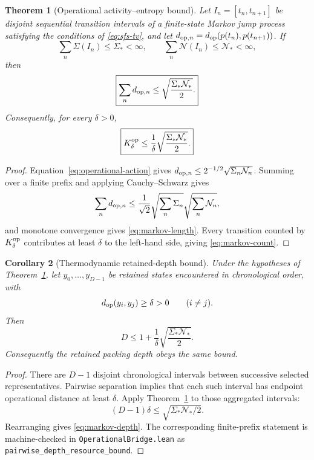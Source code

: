 \documentclass[11pt,a4paper]{article}
\newtheorem{theorem}{Theorem}[section]
\newtheorem{corollary}[theorem]{Corollary}
\theoremstyle{definition}
\numberwithin{equation}{section}
\begin{document}
\begin{theorem}[Operational activity--entropy bound]
\label{thm:markov-operational}
Let $I_n=[t_n,t_{n+1}]$ be disjoint sequential transition intervals of a
finite-state Markov jump process satisfying the conditions of
\eqref{eq:sfs-tv}, and let
$d_{{\rm op},n}=d_{\rm op}(p(t_n),p(t_{n+1}))$.
If
\[
\sum_n\Sigma(I_n)\le\Sigma_*<\infty,
\qquad
\sum_n\mathcal N(I_n)\le\mathcal N_*<\infty,
\]
then
\begin{equation}
\boxed{
\sum_n d_{{\rm op},n}
\le
\sqrt{\frac{\Sigma_*\mathcal N_*}{2}}.
}
\label{eq:markov-length}
\end{equation}
Consequently, for every $\delta>0$,
\begin{equation}
\boxed{
K_\delta^{\rm op}
\le
\frac1\delta
\sqrt{\frac{\Sigma_*\mathcal N_*}{2}}.
}
\label{eq:markov-count}
\end{equation}
\end{theorem}

\begin{proof}
Equation~\eqref{eq:operational-action} gives
$d_{{\rm op},n}\le
2^{-1/2}\sqrt{\Sigma_n\mathcal N_n}$.
Summing over a finite prefix and applying Cauchy--Schwarz gives
\[
\sum_n d_{{\rm op},n}
\le
\frac1{\sqrt2}
\sqrt{\sum_n\Sigma_n}
\sqrt{\sum_n\mathcal N_n},
\]
and monotone convergence gives \eqref{eq:markov-length}.
Every transition counted by $K_\delta^{\rm op}$ contributes at least
$\delta$ to the left-hand side, giving \eqref{eq:markov-count}.
\end{proof}

\begin{corollary}[Thermodynamic retained-depth bound]
\label{cor:markov-depth}
Under the hypotheses of Theorem~\ref{thm:markov-operational}, let
$y_0,\ldots,y_{D-1}$ be retained states encountered in chronological order,
with
\[
d_{\rm op}(y_i,y_j)\ge\delta>0
\qquad(i\ne j).
\]
Then
\begin{equation}
\boxed{
D
\le
1+\frac1\delta
\sqrt{\frac{\Sigma_*\mathcal N_*}{2}}.
}
\label{eq:markov-depth}
\end{equation}
Consequently the retained packing depth obeys the same bound.
\end{corollary}

\begin{proof}
There are $D-1$ disjoint chronological intervals between successive selected
representatives. Pairwise separation implies that each such interval has
endpoint operational distance at least $\delta$. Apply
Theorem~\ref{thm:markov-operational} to those aggregated intervals:
\[
(D-1)\delta
\le
\sqrt{\Sigma_*\mathcal N_*/2}.
\]
Rearranging gives \eqref{eq:markov-depth}. The corresponding finite-prefix
statement is machine-checked in
\texttt{OperationalBridge.lean} as
\texttt{pairwise\_depth\_resource\_bound}.
\end{proof}
\end{document}
